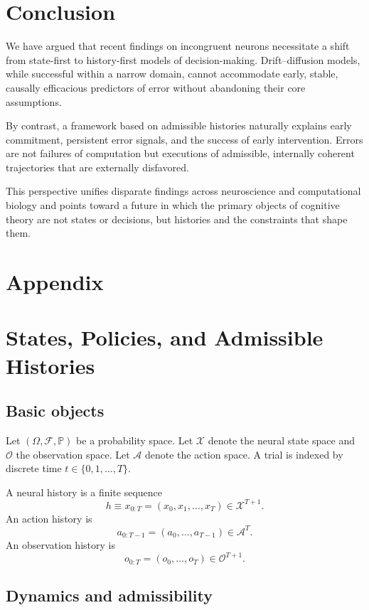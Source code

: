 \documentclass[11pt]{article}
\begin{document}
\section{Conclusion}

We have argued that recent findings on incongruent neurons necessitate a shift from state-first to history-first models of decision-making. Drift–diffusion models, while successful within a narrow domain, cannot accommodate early, stable, causally efficacious predictors of error without abandoning their core assumptions.

By contrast, a framework based on admissible histories naturally explains early commitment, persistent error signals, and the success of early intervention. Errors are not failures of computation but executions of admissible, internally coherent trajectories that are externally disfavored.

This perspective unifies disparate findings across neuroscience and computational biology and points toward a future in which the primary objects of cognitive theory are not states or decisions, but histories and the constraints that shape them.


\section*{Appendix} 

\appendix
\section{States, Policies, and Admissible Histories}

\subsection{Basic objects}

Let $(\Omega,\mathcal{F},\mathbb{P})$ be a probability space. Let $\mathcal{X}$ denote the neural state space and $\mathcal{O}$ the observation space. Let $\mathcal{A}$ denote the action space. A trial is indexed by discrete time $t\in\{0,1,\dots,T\}$.

A neural history is a finite sequence
\[
h \equiv x_{0:T} = (x_0,x_1,\dots,x_T)\in \mathcal{X}^{T+1}.
\]
An action history is
\[
a_{0:T-1}=(a_0,\dots,a_{T-1})\in\mathcal{A}^{T}.
\]
An observation history is
\[
o_{0:T}=(o_0,\dots,o_T)\in\mathcal{O}^{T+1}.
\]

\subsection{Dynamics and admissibility}
\end{document}
